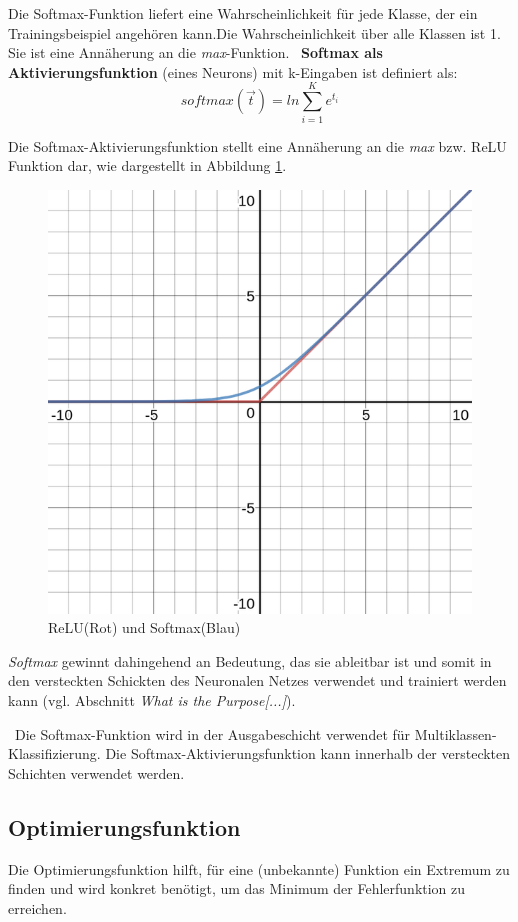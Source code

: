 Die Softmax-Funktion liefert eine Wahrscheinlichkeit für jede Klasse, der ein Trainingsbeispiel angehören kann.Die Wahrscheinlichkeit über alle Klassen ist 1. Sie ist eine Annäherung an die \textit{max}-Funktion.
~\newline \textbf{Softmax als Aktivierungsfunktion} (eines Neurons) mit k-Eingaben ist definiert als:
\begin{equation}
	\label{SoftmaxNeuron}
	softmax(\vec{t})=ln\sum_{i=1}^{K}e^{t_i}
\end{equation}

Die Softmax-Aktivierungsfunktion stellt eine Annäherung an die \textit{max} bzw. ReLU Funktion dar, wie dargestellt in Abbildung \ref{fig:Softmaxplot}.
\begin{figure}[h]
	\begin{center}
		\includegraphics[width=0.4\linewidth]{Bilder/Softmaxplot}
		\caption[Softmax:\newline \tiny \url{
			https://www.quora.com/Why-is-softmax-activate-function-called-softmax}\normalsize]{ReLU(Rot) und Softmax(Blau)}
		\label{fig:Softmaxplot}
	\end{center}
\end{figure}  \textit{Softmax} gewinnt dahingehend an Bedeutung, das sie ableitbar ist und somit in den versteckten Schickten des Neuronalen Netzes verwendet und trainiert werden kann (vgl. \cite{Softmax} Abschnitt \textit{What is the Purpose[...]}).

~\newline Die Softmax-Funktion wird in der Ausgabeschicht verwendet für Multiklassen-Klassifizierung. Die Softmax-Aktivierungsfunktion kann innerhalb der versteckten Schichten verwendet werden. 
\subsection{Optimierungsfunktion}
Die Optimierungsfunktion hilft, für eine (unbekannte) Funktion ein Extremum zu finden und wird konkret benötigt, um das Minimum der Fehlerfunktion zu erreichen.  

